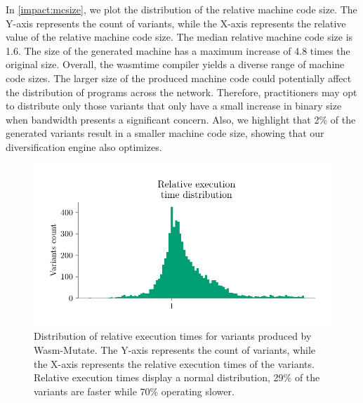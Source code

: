\documentclass[a4paper,fleqn]{cas-dc}
\newcommand{\tool}{{\sc Wasm-Mutate}\xspace}
\newcommand{\Wasm}{WebAssembly\xspace}
\newenvironment{revision1}{\color{blue}}{}
\begin{document}
\begin{revision1}
In \autoref{impact:mcsize}, we plot the distribution of the relative machine code size.
The Y-axis represents the count of variants, while the X-axis represents the relative value of the relative machine code size.
The median relative machine code size is 1.6.
The size of the generated machine has a maximum increase of 4.8 times the original size.
Overall, the wasmtime compiler yields a diverse range of machine code sizes.
The larger size of the produced machine code could potentially affect the distribution of programs across the network.
Therefore, practitioners may opt to distribute only those variants that only have a small increase in binary size when bandwidth presents a significant concern.
Also, we highlight that 2\% of the generated variants result in a smaller machine code size, showing that our diversification engine also optimizes.


\begin{figure}
    \centering
    \includegraphics[width=\linewidth]{plots/rq4/ext.pdf}
    \caption{Distribution of relative execution times for variants produced by \tool.
The Y-axis represents the count of variants, while the X-axis represents the relative execution times of the variants. Relative execution times display a normal distribution, 29\% of the variants are faster while 70\% operating slower. }
  \label{impact:time}
\end{figure}


\end{revision1}
\end{document}
